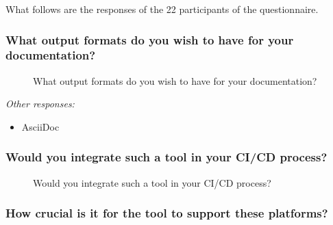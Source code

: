 What follows are the responses of the 22 participants of the questionnaire.

\subsubsection*{What output formats do you wish to have for your documentation?}

\begin{figure}[H]
    \centering
    \caption{What output formats do you wish to have for your documentation?}
    \label{fig:qOutputFormats}
\end{figure}

\textit{Other responses:}
\begin{itemize}
    \item AsciiDoc
\end{itemize}

\subsubsection*{Would you integrate such a tool in your CI/CD process?}

\begin{figure}[H]
    \centering
    \caption{Would you integrate such a tool in your CI/CD process?}
\end{figure}

\subsubsection*{How crucial is it for the tool to support these platforms?}

